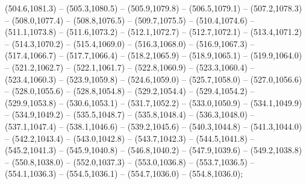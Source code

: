(504.6,1081.3) -- (505.3,1080.5) -- (505.9,1079.8) -- (506.5,1079.1) -- (507.2,1078.3) -- (508.0,1077.4) -- (508.8,1076.5) -- (509.7,1075.5) -- (510.4,1074.6) -- (511.1,1073.8) -- (511.6,1073.2) -- (512.1,1072.7) -- (512.7,1072.1) -- (513.4,1071.2) -- (514.3,1070.2) -- (515.4,1069.0) -- (516.3,1068.0) -- (516.9,1067.3) -- (517.4,1066.7) -- (517.7,1066.4) -- (518.2,1065.9) -- (518.9,1065.1) -- (519.9,1064.0) -- (521.2,1062.7) -- (522.1,1061.7) -- (522.8,1060.9) -- (523.3,1060.4) -- (523.4,1060.3) -- (523.9,1059.8) -- (524.6,1059.0) -- (525.7,1058.0) -- (527.0,1056.6) -- (528.0,1055.6) -- (528.8,1054.8) -- (529.2,1054.4) -- (529.4,1054.2) -- (529.9,1053.8) -- (530.6,1053.1) -- (531.7,1052.2) -- (533.0,1050.9) -- (534.1,1049.9) -- (534.9,1049.2) -- (535.5,1048.7) -- (535.8,1048.4) -- (536.3,1048.0) -- (537.1,1047.4) -- (538.1,1046.6) -- (539.2,1045.6) -- (540.3,1044.8) -- (541.3,1044.0) -- (542.2,1043.4) -- (543.0,1042.8) -- (543.7,1042.3) -- (544.5,1041.8) -- (545.2,1041.3) -- (545.9,1040.8) -- (546.8,1040.2) -- (547.9,1039.6) -- (549.2,1038.8) -- (550.8,1038.0) -- (552.0,1037.3) -- (553.0,1036.8) -- (553.7,1036.5) -- (554.1,1036.3) -- (554.5,1036.1) -- (554.7,1036.0) -- (554.8,1036.0);
